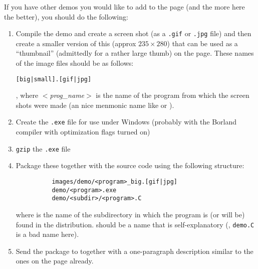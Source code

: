If you have other demos you would like to add to the page (and the more 
here the better), you should do the following:
\begin{enumerate}
\item Compile the demo and create a screen shot (as a \texttt{.gif} or 
      \texttt{.jpg} file) and then create a smaller version of this 
      (approx $235 \times 280$) that can be used as a ``thumbnail'' 
      (admittedly for a rather large thumb) on the page.  These names of
      the image files should be as follows: 
      \centerline{\texttt{[big|small].[gif|jpg]}},
      where \textit{$<$prog\_name$>$} is the name of the program from which
      the screen shots were made (an nice menmonic name like 
       or ).

\item Create the \texttt{.exe} file for use under Windows (probably with the 
      Borland compiler with optimization flags turned on)
\item \texttt{gzip} the \texttt{.exe} file
\item Package these together with the source code using the following structure:
      \begin{verbatim}
          images/demo/<program>_big.[gif|jpg]
          demo/<program>.exe
          demo/<subdir>/<program>.C
      \end{verbatim}
      where  is the name of the subdirectory in which the program
      is (or will be) found in the distribution.  should be a 
      name that is self-explanatory (\eg, \texttt{demo.C} is a bad name here).

\item Send the package to  together with a one-paragraph description similar to the
      ones on the page already.
\end{enumerate}


